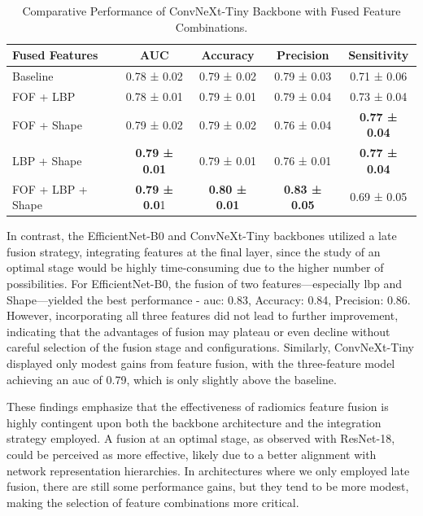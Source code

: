 \begin{table}[htb]
  \centering
  \caption{Comparative Performance of ConvNeXt-Tiny Backbone with Fused Feature Combinations.}
  \label{tab:convnext_tiny_fusion_metrics}
  \begin{tabular}{@{} l  c  c  c  c @{}}
    \toprule
    \textbf{Fused Features} 
      & \textbf{AUC} 
      & \textbf{Accuracy} 
      & \textbf{Precision} 
      & \textbf{Sensitivity} \\
    \midrule
    Baseline                & 0.78 ± 0.02 & 0.79 ± 0.02 & 0.79 ± 0.03 & 0.71 ± 0.06\\
    \hline \addlinespace
    FOF + LBP               & 0.78 ± 0.01 & 0.79 ± 0.01 & 0.79 ± 0.04 & 0.73 ± 0.04 \\
    FOF + Shape             & 0.79 ± 0.02 & 0.79 ± 0.02	& 0.76 ± 0.04 &\textbf{ 0.77 ± 0.04} \\
    LBP + Shape             & \textbf{0.79 ± 0.01} & 0.79 ± 0.01	& 0.76 ± 0.01 & \textbf{0.77 ± 0.04} \\
    \hline \addlinespace
    FOF + LBP + Shape       & \textbf{0.79 ± 0.0}1 & \textbf{0.80 ± 0.01} & \textbf{0.83 ± 0.05} & 0.69 ± 0.05 \\
    \bottomrule
  \end{tabular}
\end{table}

In contrast, the EfficientNet-B0 and ConvNeXt-Tiny backbones utilized a late fusion strategy, integrating features at the final layer, since the study of an optimal stage would be highly time-consuming due to the higher number of possibilities. For EfficientNet-B0, the fusion of two features—especially \ac{lbp} and Shape—yielded the best performance - \ac{auc}: 0.83, Accuracy: 0.84, Precision: 0.86. However, incorporating all three features did not lead to further improvement, indicating that the advantages of fusion may plateau or even decline without careful selection of the fusion stage and configurations. Similarly, ConvNeXt-Tiny displayed only modest gains from feature fusion, with the three-feature model achieving an \ac{auc} of 0.79, which is only slightly above the baseline.

These findings emphasize that the effectiveness of radiomics feature fusion is highly contingent upon both the backbone architecture and the integration strategy employed. A fusion at an optimal stage, as observed with ResNet-18, could be perceived as more effective, likely due to a better alignment with network representation hierarchies. In architectures where we only employed late fusion, there are still some performance gains, but they tend to be more modest, making the selection of feature combinations more critical.


